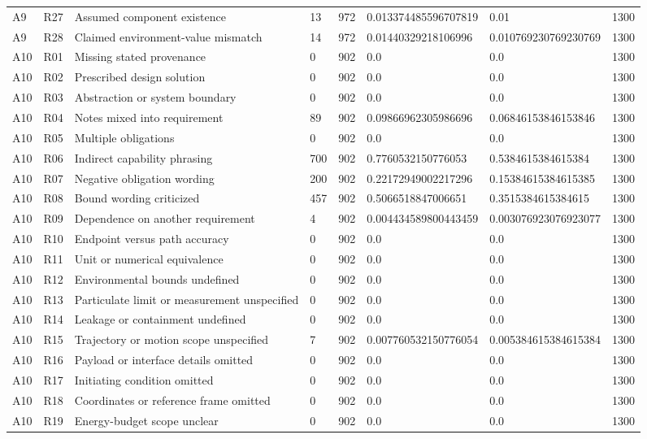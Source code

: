 \begin{tabular}{llllllll}
A9 & R27 & Assumed component existence & 13 & 972 & 0.013374485596707819 & 0.01 & 1300 \\
A9 & R28 & Claimed environment-value mismatch & 14 & 972 & 0.01440329218106996 & 0.010769230769230769 & 1300 \\
A10 & R01 & Missing stated provenance & 0 & 902 & 0.0 & 0.0 & 1300 \\
A10 & R02 & Prescribed design solution & 0 & 902 & 0.0 & 0.0 & 1300 \\
A10 & R03 & Abstraction or system boundary & 0 & 902 & 0.0 & 0.0 & 1300 \\
A10 & R04 & Notes mixed into requirement & 89 & 902 & 0.09866962305986696 & 0.06846153846153846 & 1300 \\
A10 & R05 & Multiple obligations & 0 & 902 & 0.0 & 0.0 & 1300 \\
A10 & R06 & Indirect capability phrasing & 700 & 902 & 0.7760532150776053 & 0.5384615384615384 & 1300 \\
A10 & R07 & Negative obligation wording & 200 & 902 & 0.22172949002217296 & 0.15384615384615385 & 1300 \\
A10 & R08 & Bound wording criticized & 457 & 902 & 0.5066518847006651 & 0.3515384615384615 & 1300 \\
A10 & R09 & Dependence on another requirement & 4 & 902 & 0.004434589800443459 & 0.003076923076923077 & 1300 \\
A10 & R10 & Endpoint versus path accuracy & 0 & 902 & 0.0 & 0.0 & 1300 \\
A10 & R11 & Unit or numerical equivalence & 0 & 902 & 0.0 & 0.0 & 1300 \\
A10 & R12 & Environmental bounds undefined & 0 & 902 & 0.0 & 0.0 & 1300 \\
A10 & R13 & Particulate limit or measurement unspecified & 0 & 902 & 0.0 & 0.0 & 1300 \\
A10 & R14 & Leakage or containment undefined & 0 & 902 & 0.0 & 0.0 & 1300 \\
A10 & R15 & Trajectory or motion scope unspecified & 7 & 902 & 0.007760532150776054 & 0.005384615384615384 & 1300 \\
A10 & R16 & Payload or interface details omitted & 0 & 902 & 0.0 & 0.0 & 1300 \\
A10 & R17 & Initiating condition omitted & 0 & 902 & 0.0 & 0.0 & 1300 \\
A10 & R18 & Coordinates or reference frame omitted & 0 & 902 & 0.0 & 0.0 & 1300 \\
A10 & R19 & Energy-budget scope unclear & 0 & 902 & 0.0 & 0.0 & 1300 \\

\end{tabular}

